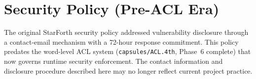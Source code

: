 
\section*{Security Policy (Pre-ACL Era)}

The original StarForth security policy addressed vulnerability disclosure
through a contact-email mechanism with a 72-hour response commitment. This
policy predates the word-level ACL system (\texttt{capsules/ACL.4th}, Phase~6
complete) that now governs runtime security enforcement. The contact information
and disclosure procedure described here may no longer reflect current project
practice.


